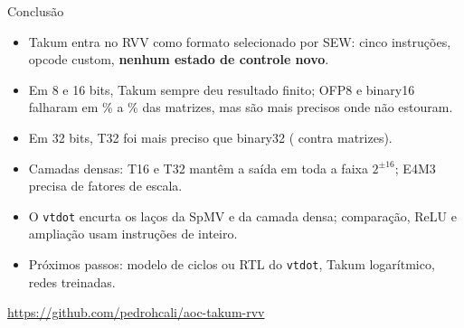 \documentclass[aspectratio=169,10pt]{beamer}
\newcommand{\code}[1]{\texttt{#1}}
\begin{document}
\begin{frame}{Conclusão}
\begin{itemize}
\item Takum entra no RVV como formato selecionado por SEW: cinco instruções,
  opcode custom, \textbf{nenhum estado de controle novo}.
\item Em 8 e 16 bits, Takum sempre deu resultado finito; OFP8 e binary16 falharam
  em \BenchInfFPSixteen\% a \BenchInfEFourMThree\% das matrizes, mas são mais precisos onde não estouram.
\item Em 32 bits, T32 foi mais preciso que binary32 (\BenchBetterTThirtyTwoFPThirtyTwo{} contra \BenchWorseTThirtyTwoFPThirtyTwo{} matrizes).
\item Camadas densas: T16 e T32 mantêm a saída em toda a faixa $2^{\pm16}$; E4M3 precisa de fatores de escala.
\item O \code{vtdot} encurta os laços da SpMV e da camada densa; comparação, ReLU e ampliação usam instruções de inteiro.
\item Próximos passos: modelo de ciclos ou RTL do \code{vtdot}, Takum logarítmico,
  redes treinadas.
\end{itemize}
\vspace{1em}
\centering \small \url{https://github.com/pedrohcali/aoc-takum-rvv}
\end{frame}
\end{document}
